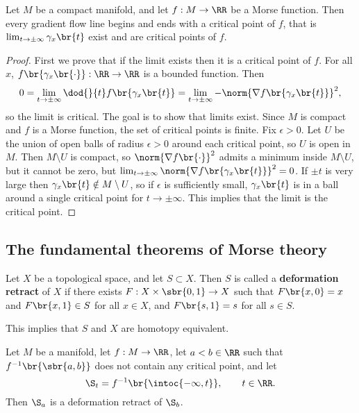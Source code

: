 \begin{proposition}
Let $ M $ be a compact manifold, and let $ f : M \to \RR $ be a Morse function. Then every gradient flow line begins and ends with a critical point of $ f $, that is $ \lim_{t \to \pm\infty} \gamma_x\br{t} $ exist and are critical points of $ f $.
\end{proposition}

\begin{proof}
First we prove that if the limit exists then it is a critical point of $ f $. For all $ x $, $ f\br{\gamma_x\br{\cdot}} : \RR \to \RR $ is a bounded function. Then
$$ 0 = \lim_{t \to \pm\infty} \dod{}{t}f\br{\gamma_x\br{t}} = \lim_{t \to \pm\infty} -\norm{\nabla f\br{\gamma_x\br{t}}}^2, $$
so the limit is critical. The goal is to show that limits exist. Since $ M $ is compact and $ f $ is a Morse function, the set of critical points is finite. Fix $ \epsilon > 0 $. Let $ U $ be the union of open balls of radius $ \epsilon > 0 $ around each critical point, so $ U $ is open in $ M $. Then $ M \setminus U $ is compact, so $ \norm{\nabla f\br{\cdot}}^2 $ admits a minimum inside $ M \setminus U $, but it cannot be zero, but $ \lim_{t \to \pm\infty} \norm{\nabla f\br{\gamma_x\br{t}}}^2 = 0 $. If $ \pm t $ is very large then $ \gamma_x\br{t} \notin M \setminus U $, so if $ \epsilon $ is sufficiently small, $ \gamma_x\br{t} $ is in a ball around a single critical point for $ t \to \pm\infty $. This implies that the limit is the critical point.
\end{proof}

\subsection{The fundamental theorems of Morse theory}


\begin{definition}
Let $ X $ be a topological space, and let $ S \subset X $. Then $ S $ is called a \textbf{deformation retract} of $ X $ if there exists $ F : X \times \sbr{0, 1} \to X $ such that $ F\br{x, 0} = x $ and $ F\br{x, 1} \in S $ for all $ x \in X $, and $ F\br{s, 1} = s $ for all $ s \in S $.
\end{definition}

This implies that $ S $ and $ X $ are homotopy equivalent.

\begin{theorem}
\label{thm:3.20}
Let $ M $ be a manifold, let $ f : M \to \RR $, let $ a < b \in \RR $ such that $ f^{-1}\br{\sbr{a, b}} $ does not contain any critical point, and let
$$ \S_t = f^{-1}\br{\intoc{-\infty, t}}, \qquad t \in \RR. $$
Then $ \S_a $ is a deformation retract of $ \S_b $.
\end{theorem}

